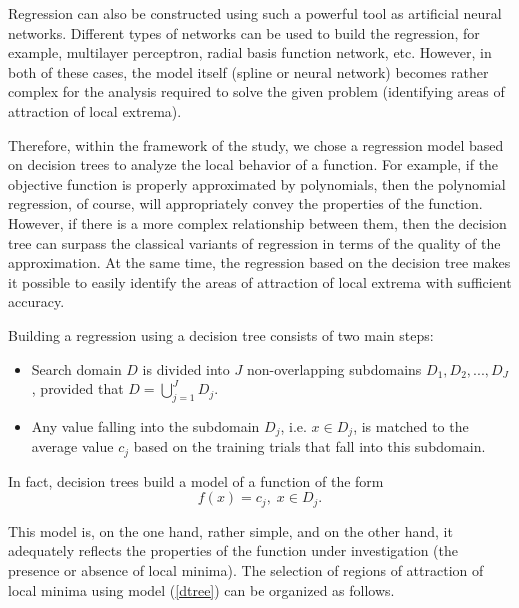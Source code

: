 \documentclass[entropy,article,submit,moreauthors,pdftex]{Definitions/mdpi}
\begin{document}
Regression can also be constructed using such a powerful tool as artificial neural networks. 
Different types of networks can be used to build the regression, for example, multilayer perceptron, radial basis function network, etc.
However, in both of these cases, the model itself (spline or neural network) becomes rather complex for the analysis required to solve the given problem (identifying areas of attraction of local extrema).

Therefore, within the framework of the study, we chose a regression model based on decision trees to analyze the local behavior of a function.
For example, if the objective function is properly approximated by polynomials, then the polynomial regression, of course, will appropriately convey the properties of the function. However, if there is a more complex relationship between them, then the decision tree can surpass the classical variants of regression in terms of the quality of the approximation. 
At the same time, the regression based on the decision tree makes it possible to easily identify the areas of attraction of local extrema with sufficient accuracy.

Building a regression using a decision tree consists of two main steps:
\begin{itemize}
	\item Search domain $D$ is divided into $J$ non-overlapping subdomains  $D_1, D_2, ..., D_J$, provided that $D = \bigcup_{j=1}^{J}{D_j}$.
	\item Any value falling into the subdomain $D_j$, i.e. $x \in D_j$, is matched to the average value  $c_j$ based on the training trials that fall into this subdomain. 
\end{itemize}

In fact, decision trees build a model of a function of the form
\begin{equation}\label{dtree}
f(x) = c_j, \; x\in D_j.
\end{equation}
 
This model is, on the one hand, rather simple, and on the other hand, it adequately reflects the properties of the function under investigation (the presence or absence of local minima). The selection of regions of attraction of local minima using model (\ref{dtree}) can be organized as follows.
\end{document}
